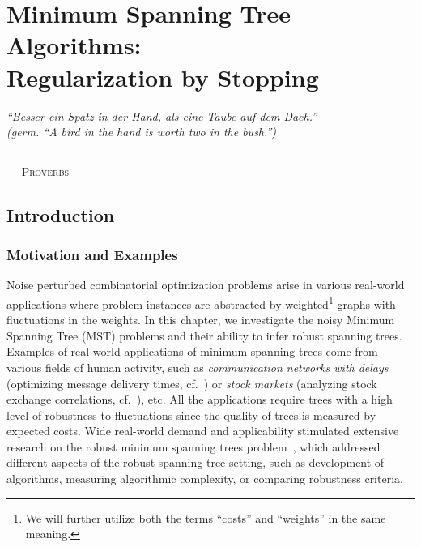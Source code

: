\chapter[Minimum Spanning Tree Algorithms: Regularization by Stopping]{Minimum Spanning Tree
  Algorithms: \\ Regularization by Stopping}
\label{ch:mst}

\hfill
\begin{minipage}[t]{.75\textwidth}
\textit{``Besser ein Spatz in der Hand, als eine Taube auf dem Dach.'' \\
  (germ. ``A bird in the hand is worth two in the bush.'')} \\
  \hrule
  \vspace{.2cm}
  \hfill
  \textsc{--- Proverbs}
\end{minipage}

\section{Introduction}

\subsection{Motivation and Examples} 

Noise perturbed combinatorial optimization problems arise in various real-world
applications where problem instances are abstracted by weighted\footnote{We will
further utilize both the terms ``costs'' and ``weights'' in the same meaning.}
graphs with fluctuations in the weights. In this chapter, we
investigate the noisy Minimum Spanning Tree (MST) problems and their ability to
infer robust spanning trees. Examples of real-world applications of minimum
spanning trees come from various fields of human activity, such as
\emph{communication networks with delays} (optimizing message delivery times,
cf.~\citep{Bertsekas:1987}) or \emph{stock markets} (analyzing stock exchange
correlations, cf.~\citep{Sandoval:2012}), etc. All the applications require
trees with a high level of robustness to fluctuations since the quality of trees
is measured by expected costs. Wide real-world demand and applicability
stimulated extensive research on the robust minimum spanning trees
problem~\citep{Aron:2004, Kozina:1994, Sandoval:2012, Yaman:Karasan:Pinar:2001},
which addressed different aspects of the robust spanning tree setting, such as
development of algorithms, measuring algorithmic complexity, or comparing
robustness criteria.

